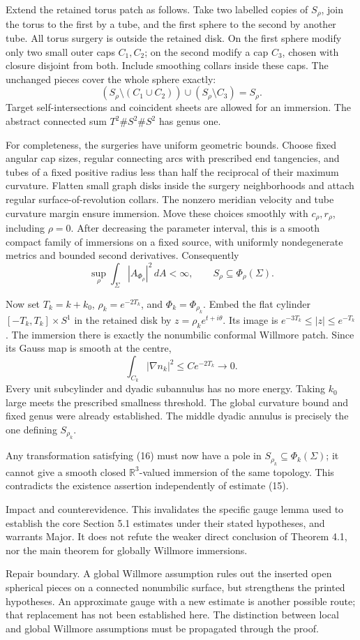 \documentclass[10pt]{article}
\begin{document}
Extend the retained torus patch as follows. Take two labelled copies of \(S_\rho\), join the torus to the first by a tube, and the first sphere to the second by another tube. All torus surgery is outside the retained disk. On the first sphere modify only two small outer caps \(C_1,C_2\); on the second modify a cap \(C_3\), chosen with closure disjoint from both. Include smoothing collars inside these caps. The unchanged pieces cover the whole sphere exactly: \[(S_\rho\setminus(C_1\cup C_2))
       \cup(S_\rho\setminus C_3)=S_\rho .\] Target self-intersections and coincident sheets are allowed for an immersion. The abstract connected sum \(T^2\#S^2\#S^2\) has genus one.\par
For completeness, the surgeries have uniform geometric bounds. Choose fixed angular cap sizes, regular connecting arcs with prescribed end tangencies, and tubes of a fixed positive radius less than half the reciprocal of their maximum curvature. Flatten small graph disks inside the surgery neighborhoods and attach regular surface-of-revolution collars. The nonzero meridian velocity and tube curvature margin ensure immersion. Move these choices smoothly with \(c_\rho,r_\rho\), including \(\rho=0\). After decreasing the parameter interval, this is a smooth compact family of immersions on a fixed source, with uniformly nondegenerate metrics and bounded second derivatives. Consequently \[\sup_\rho\int_\Sigma |A_{\Phi_\rho}|^2\,dA<\infty,\qquad
 S_\rho\subseteq\Phi_\rho(\Sigma).\]\par
Now set \(T_k=k+k_0\), \(\rho_k=e^{-2T_k}\), and \(\Phi_k=\Phi_{\rho_k}\). Embed the flat cylinder \([-T_k,T_k]\times S^1\) in the retained disk by \(z=\rho_ke^{t+i\theta}\). Its image is \(e^{-3T_k}\le|z|\le e^{-T_k}\). The immersion there is exactly the nonumbilic conformal Willmore patch. Since its Gauss map is smooth at the centre, \[\int_{C_k}|\nabla n_k|^2\le Ce^{-2T_k}\longrightarrow0.\] Every unit subcylinder and dyadic subannulus has no more energy. Taking \(k_0\) large meets the prescribed smallness threshold. The global curvature bound and fixed genus were already established. The middle dyadic annulus is precisely the one defining \(S_{\rho_k}\).\par
Any transformation satisfying (16) must now have a pole in \(S_{\rho_k}\subseteq\Phi_k(\Sigma)\); it cannot give a smooth closed \(\mathbb R^3\)-valued immersion of the same topology. This contradicts the existence assertion independently of estimate (15).\par
Impact and counterevidence. This invalidates the specific gauge lemma used to establish the core Section 5.1 estimates under their stated hypotheses, and warrants Major. It does not refute the weaker direct conclusion of Theorem 4.1, nor the main theorem for globally Willmore immersions.\par
Repair boundary. A global Willmore assumption rules out the inserted open spherical pieces on a connected nonumbilic surface, but strengthens the printed hypotheses. An approximate gauge with a new estimate is another possible route; that replacement has not been established here. The distinction between local and global Willmore assumptions must be propagated through the proof.\par
\end{document}
